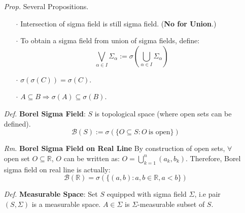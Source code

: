 \documentclass[a4paper,12pt,twoside]{book}
\begin{document}
\begin{itemize}
	\item[\textit{Prop.}] Several Propositions.
	\begin{itemize}
		\item[$\cdot$] Intersection of sigma field is still sigma field. (\textbf{No for Union}.)
		\item[$\cdot$] To obtain a sigma field from union of sigma fields, define:
		\begin{equation}
			\bigvee_{\alpha \in I}\Sigma_{\alpha}:=\sigma(\bigcup_{\alpha \in I}\Sigma_{\alpha})
		\end{equation}
		\item[$\cdot$] $\sigma(\sigma(C))=\sigma(C)$.
		\item[$\cdot$] $A \subseteq B \Rightarrow\sigma(A)\subseteq\sigma(B)$.
	\end{itemize}

	\item[\textit{Def.}] \textbf{Borel Sigma Field}: $S$ is topological space (where open sets can be defined).
	\begin{equation}
	 	\mathscr{B}(S):=\sigma(\{O \subseteq S: O~\text{is open}\})
	\end{equation}
	\item[\textit{Rm.}] \textbf{Borel Sigma Field on Real Line} By construction of open sets, $\forall$ open set $O \subseteq \mathbb{R}$, $O$ can be written as: $O=\bigcup_{k=1}^{n}(a_k, b_k)$. Therefore, Borel sigma field on real line is actually: 
	\begin{equation}
		\mathscr{B}(\mathbb{R})=\sigma(\{(a,b): a,b \in \mathbb{R}, a<b\})
	\end{equation}

	\item[\textit{Def.}] \textbf{Measurable Space}: Set $S$ equipped with sigma field $\Sigma$, i.e pair $(S, \Sigma)$ is a measurable space. $A\in \Sigma$ is $\Sigma$-measurable subset of $S$.
\end{itemize}

\end{document}
